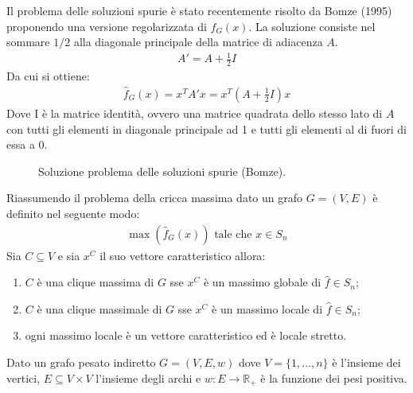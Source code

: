 Il problema delle soluzioni spurie è stato recentemente risolto da Bomze (1995) proponendo una versione regolarizzata di $f_G(x)$. La soluzione consiste nel sommare $1/2$ alla diagonale principale della matrice di adiacenza $A$.
\begin{align*}
    A' = A + \frac{1}{2} I
\end{align*}
Da cui si ottiene:
\begin{align*}
    \hat{f}_G(x) = x^T A' x = x^T \left( A + \frac{1}{2} I \right) x 
\end{align*}
Dove I è la matrice identità, ovvero una matrice quadrata dello stesso lato di $A$ con tutti gli elementi in diagonale principale ad 1 e tutti gli elementi al di fuori di essa a 0.\\


\begin{figure}[h!]
    \centering
    \caption{Soluzione problema delle soluzioni spurie (Bomze).}
\end{figure}

Riassumendo il problema della cricca massima dato un grafo $G = (V, E)$ è definito nel seguente modo:
\begin{align*}
	\max(\hat{f}_G(x)) \text{ tale che } x \in S_n
\end{align*}
Sia $C \subseteq V$ e sia $x^C$ il suo vettore caratteristico allora:
\begin{enumerate}
	\item $C$ è una clique massima di $G$ sse $x^C$ è un massimo globale di $\hat{f} \in S_n$;
	\item $C$ è una clique massimale di $G$ sse $x^C$ è un massimo locale di $\hat{f} \in S_n$;
	\item ogni massimo locale è un vettore caratteristico ed è locale stretto. 
\end{enumerate}



\label{subsec:Definizione di insieme dominante}
Dato un grafo pesato indiretto $G = (V, E , w)$ dove $V = \{ 1, \dots, n \}$ è l'insieme dei vertici, $E \subseteq V \times V$ l'insieme degli archi e $w : E \rightarrow \mathbb{R}_+$ è la funzione dei pesi positiva.\\

